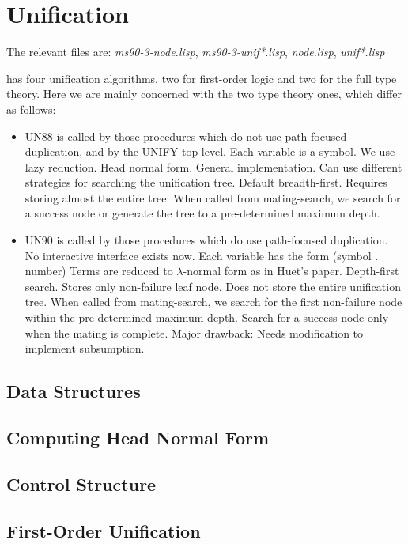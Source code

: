 \chapter{Unification}

The relevant files are: {\it ms90-3-node.lisp}, {\it ms90-3-unif*.lisp}, 
{\it node.lisp}, {\it unif*.lisp}

\TPS has four unification algorithms, two for first-order logic and
two for the full type theory. Here we are mainly concerned with the two
type theory ones, which differ as follows:

\begin{itemize}
\item UN88 is called by those procedures which do not use
path-focused duplication, and by the \TPS UNIFY top level.
Each variable is a symbol. We use lazy reduction. Head normal form.
General implementation. Can use different strategies for searching the
unification tree. Default breadth-first. Requires storing almost the
entire tree.
When called from mating-search, we search for a success node or generate the
tree to a pre-determined maximum depth.

\item UN90 is called by those procedures which do use
path-focused duplication. No interactive interface exists now.
Each variable has the form (symbol . number)
Terms are reduced to $\lambda$-normal form as in Huet's paper.
Depth-first search. Stores only non-failure leaf node.
Does not store the entire unification tree.
When called from mating-search, we search for the first non-failure node
within the pre-determined maximum depth.  Search for a success node 
only when the mating is complete.
Major drawback: Needs modification to implement subsumption. 
\end{itemize}


\section{Data Structures}
\section{Computing Head Normal Form}
\section{Control Structure}
\section{First-Order Unification}
